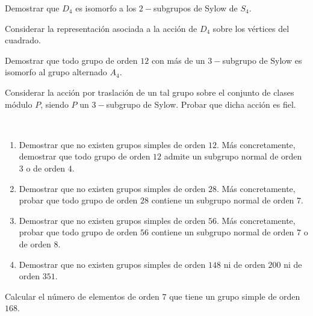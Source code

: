 \begin{ejercicio}\label{ej:6.22}
    Demostrar que $D_4$ es isomorfo a los $2-$subgrupos de Sylow de $S_4$.
    \begin{observacion}
        Considerar la representación asociada a la acción de $D_4$ sobre los vértices del cuadrado.
    \end{observacion}
\end{ejercicio}

\begin{ejercicio}\label{ej:6.23}
    Demostrar que todo grupo de orden $12$ con más de un $3-$subgrupo de Sylow es isomorfo al grupo alternado $A_4$.
    \begin{observacion}
        Considerar la acción por traslación de un tal grupo sobre el conjunto de clases módulo $P$, siendo $P$ un $3-$subgrupo de Sylow. Probar que dicha acción es fiel.
    \end{observacion}
\end{ejercicio}

\begin{ejercicio}\label{ej:6.24}~
    \begin{enumerate}
        \item Demostrar que no existen grupos simples de orden $12$. Más concretamente, demostrar que todo grupo de orden $12$ admite un subgrupo normal de orden $3$ o de orden $4$.
        \item Demostrar que no existen grupos simples de orden $28$. Más concretamente, probar que todo grupo de orden $28$ contiene un subgrupo normal de orden $7$.
        \item Demostrar que no existen grupos simples de orden $56$. Más concretamente, probar que todo grupo de orden $56$ contiene un subgrupo normal de orden $7$ o de orden $8$.
        \item Demostrar que no existen grupos simples de orden $148$ ni de orden $200$ ni de orden $351$.
    \end{enumerate}
\end{ejercicio}

\begin{ejercicio}\label{ej:6.25}
    Calcular el número de elementos de orden $7$ que tiene un grupo simple de orden $168$.
\end{ejercicio}